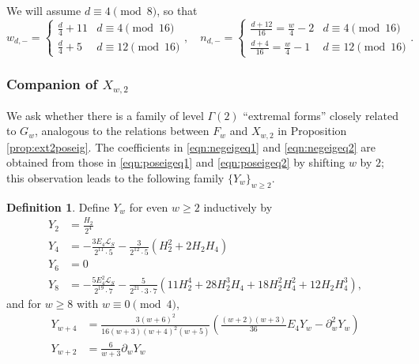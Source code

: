 \documentclass[10pt,reqno]{amsproc}
\newcommand{\cL}{\mathcal{L}}
\newcommand{\1}{\mathds{1}}	%
\theoremstyle{definition}
\newtheorem{definition}[theorem]{Definition}
\theoremstyle{remark}
\begin{document}
We will assume $d \equiv 4 \pmod{8}$, so that
\begin{equation}
    \label{eqn:wdneg}
    w_{d,-} = \begin{cases}
        \frac{d}{4} + 11 & d \equiv 4 \pmod{16} \\ \frac{d}{4} + 5 & d \equiv 12 \pmod{16}
    \end{cases},\quad
    n_{d,-} = \begin{cases}
        \frac{d + 12}{16} = \frac{w}{4} - 2 & d \equiv 4 \pmod{16} \\ \frac{d + 4}{16} = \frac{w}{4} - 1 & d \equiv 12 \pmod{16}
    \end{cases}.
\end{equation}


\subsubsection{Companion of $X_{w,2}$}
\label{subsec:Yw}

We ask whether there is a family of level $\Gamma(2)$ ``extremal forms'' closely related to $G_{w}$, analogous to the relations between $F_{w}$ and $X_{w, 2}$ in Proposition \ref{prop:ext2poseig}.
The coefficients in \eqref{eqn:negeigeq1} and \eqref{eqn:negeigeq2} are obtained from those in \eqref{eqn:poseigeq1} and \eqref{eqn:poseigeq2} by shifting $w$ by $2$; this observation leads to the following family $\{Y_{w}\}_{w \ge 2}$.

\begin{definition}
Define $Y_{w}$ for even $w \geq 2$ inductively by
\begin{align*}
    Y_{2} &= \frac{H_{2}}{2^4} \\
    Y_{4} &= -\frac{3 E_4 \cL_S}{2^{11} \cdot 5} -\frac{3}{2^{12} \cdot 5} (H_{2}^{2} + 2 H_{2} H_{4}) \\
    Y_{6} &= 0 \\
    Y_{8} &= -\frac{5 E_4^2 \cL_S}{2^{19} \cdot 7} - \frac{5}{2^{21} \cdot 3 \cdot 7} (11 H_2^4 + 28 H_2^3 H_4 + 18 H_2^2 H_4^2 + 12 H_2 H_4^3),
\end{align*}
and for $w \geq 8$ with $w \equiv 0 \pmod{4}$,
\begin{align}
    Y_{w+4} &=  \frac{3(w+6)^{2}}{16 (w+3)(w+4)^2 (w+5)}\left(\frac{(w+2)(w+3)}{36} E_4 Y_{w} - \partial_{w}^{2} Y_{w}\right) \label{eqn:Ywdef1}\\
    Y_{w+2} &= \frac{6}{w + 3} \partial_{w} Y_{w} \label{eqn:Ywdef2}
\end{align}
\end{definition}
\end{document}
